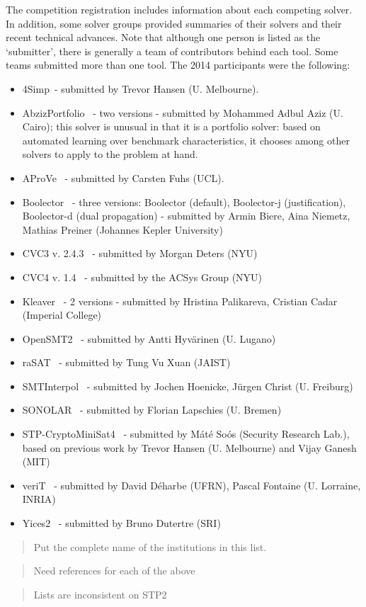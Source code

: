 \documentclass[twosize,11pt]{article}
\newcommand{\comment}[2]{\begin{quote}\sc #1\marginpar{\textcolor{red}{$\ast^{\mbox{#2}}$}}\end{quote}}
\newcommand{\davidd}[1]{\comment{#1}{DD}}
\newcommand{\davidc}[1]{\comment{#1}{DC}}
\begin{document}
The competition registration includes information about each competing solver. In addition, some solver groups provided summaries of their solvers and their recent technical advances.
 Note that although one person is listed as the `submitter', there is generally a team of contributors behind each tool. Some teams submitted more than one tool. The 2014 participants were the following:
\begin{itemize}
\item 4Simp~\cite{TBD}- submitted by Trevor Hansen (U. Melbourne).
\item AbzizPortfolio~\cite{TBD} - two versions - submitted by Mohammed Adbul Aziz (U. Cairo); this solver is unusual in that it is a portfolio solver: based on automated learning over benchmark characteristics, it chooses among other solvers to apply to the problem at hand.
\item AProVe~\cite{AProVE2014} - submitted by Carsten Fuhs (UCL).
\item Boolector~\cite{boolector} - three versions: Boolector (default), Boolector-j (justification), Boolector-d (dual propagation) - submitted by Armin Biere, Aina Niemetz, Mathias Preiner (Johannes Kepler University)
\item CVC3 v. 2.4.3~\cite{BT07} - submitted by Morgan Deters (NYU)
\item CVC4 v. 1.4~\cite{BCD+11} - submitted by the ACSys Group (NYU)
\item Kleaver~\cite{TBD} - 2 versions - submitted by Hristina Palikareva, Cristian Cadar (Imperial College)
\item OpenSMT2~\cite{TBD} - submitted by Antti Hyv\"arinen (U. Lugano)
\item raSAT~\cite{TBD} - submitted by Tung Vu Xuan (JAIST)
\item SMTInterpol~\cite{DBLP:conf/spin/ChristHN12,DBLP:conf/spin/2012} - submitted by Jochen Hoenicke, J\"urgen Christ (U. Freiburg)
\item SONOLAR~\cite{Peleska:2011:ATC:1986308.1986333} - submitted by Florian Lapschies (U. Bremen)
\item STP-CryptoMiniSat4~\cite{DBLP:conf/cav/GaneshD07,DBLP:conf/cav/2007} - submitted by M\'at\'e So\'os (Security Research Lab.), based on previous work by Trevor Hansen (U. Melbourne) and Vijay Ganesh (MIT)
\item veriT~\cite{veriT} - submitted by David D\'{e}harbe (UFRN), Pascal Fontaine (U. Lorraine, INRIA)
\item Yices2~\cite{Dutertre:cav2014} - submitted by Bruno Dutertre (SRI)
\end{itemize}
\davidd{Put the complete name of the institutions in this list.}
\davidc{Need references for each of the above}
\davidc{Lists are inconsistent on STP2}
\end{document}
